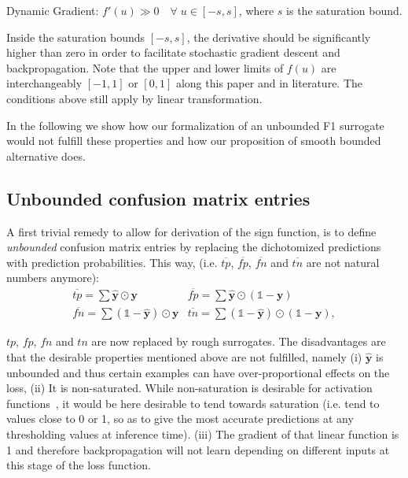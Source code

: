 \begin{property}
  Dynamic Gradient: $f'(u) \gg 0 \quad \forall \; u \in [-s, s]$, where $s$ is the saturation bound.
\end{property}

Inside the saturation bounds $[-s, s]$, the derivative should be significantly higher than zero in order to facilitate stochastic gradient descent and backpropagation.
%
Note that the upper and lower limits of $f(u)$ are interchangeably $[-1,1]$ or $[0,1]$ along this paper and in literature. The conditions above still apply by linear transformation.

In the following we show how our formalization of an unbounded F1 surrogate would not fulfill these properties and how our proposition of smooth bounded alternative does.


\subsection{Unbounded confusion matrix entries}
\label{subsec:unbounded}

A first trivial remedy to allow for derivation of the sign function, is to define \emph{unbounded} confusion matrix entries by replacing the dichotomized predictions with prediction probabilities. This way,
 (i.e. \(\overline{tp}\), \(\overline{fp}\), \(\overline{fn}\) and  \(\overline{tn}\) are not natural numbers anymore):
%
\begin{equation}
\label{eq:unbounded}
\begin{array}{ll} \overline{\mathit{tp}} = \sum \hat{\mathbf{y}} \odot \mathbf{y}  & \overline{\mathit{fp}} = \sum \hat{\mathbf{y}} \odot (\mathds{1} - \mathbf{y}) \\[.5em] \overline{\mathit{fn}} = \sum (\mathds{1} - \hat{\mathbf{y}}) \odot \mathbf{y} & \overline{\mathit{tn}} = \sum (\mathds{1} - \hat{\mathbf{y}}) \odot (\mathds{1} - \mathbf{y}),
\end{array}
\end{equation}
%

\(tp\), \(fp\), \(fn\) and \(tn\) are now replaced by rough surrogates. The disadvantages are that the desirable properties mentioned above are not fulfilled, namely (i) \(\hat{\mathbf{y}}\) is unbounded and thus certain examples can have over-proportional effects on the loss, (ii) It is non-saturated. While non-saturation is desirable for activation functions~\cite{saturation}, it would be here desirable to tend towards saturation (i.e. tend to values close to 0 or 1, so as to give the most accurate predictions at any thresholding values at inference time). (iii) The gradient of that linear function is 1 and therefore backpropagation will not learn depending on different inputs at this stage of the loss function.

